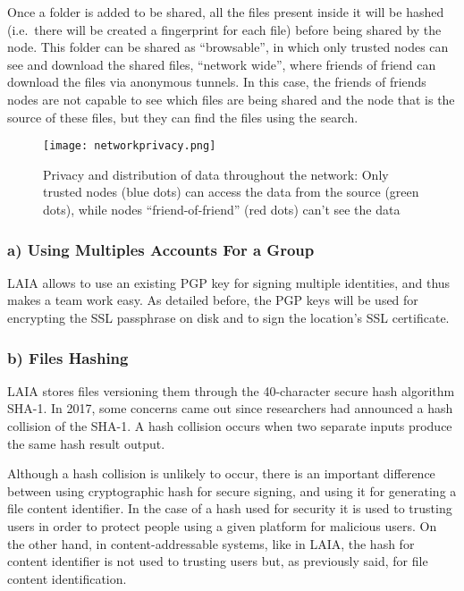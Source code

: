 \documentclass[conference,final,]{IEEEtran}
\makeatletter
\def\maxwidth{\ifdim\Gin@nat@width>\linewidth\linewidth
\else\Gin@nat@width\fi}
\let\Oldincludegraphics\includegraphics
\renewcommand{\includegraphics}[1]{\Oldincludegraphics[width=\maxwidth]{#1}}
\makeatother
\begin{document}
Once a folder is added to be shared, all the files present inside it
will be hashed (i.e.~there will be created a fingerprint for each file)
before being shared by the node. This folder can be shared as
``browsable'', in which only trusted nodes can see and download the
shared files, ``network wide'', where friends of friend can download the
files via anonymous tunnels. In this case, the friends of friends nodes
are not capable to see which files are being shared and the node that is
the source of these files, but they can find the files using the search.


\begin{figure}[htbp]
\centering
\texttt{[image: networkprivacy.png]}
\caption{Privacy and distribution of data throughout the network: Only
trusted nodes (blue dots) can access the data from the source (green
dots), while nodes ``friend-of-friend'' (red dots) can't see the data}
\end{figure}


\hypertarget{a-using-multiples-accounts-for-a-group}{%
\subsubsection{a) Using Multiples Accounts For a
Group}\label{a-using-multiples-accounts-for-a-group}}

LAIA allows to use an existing PGP key for signing multiple identities,
and thus makes a team work easy. As detailed before, the PGP keys will be
used for encrypting the SSL passphrase on disk and to sign the
location's SSL certificate.

\hypertarget{b-files-hashing}{%
\subsubsection{b) Files Hashing}\label{b-files-hashing}}

LAIA stores files versioning them through the 40-character
secure hash algorithm SHA-1. In 2017, some concerns came out since
researchers had announced a hash collision of the SHA-1. A hash
collision occurs when two separate inputs produce the same hash result
output.

Although a hash collision is unlikely to occur, there is an important
difference between using cryptographic hash for secure signing, and
using it for generating a file content identifier. In the case of a hash
used for security it is used to trusting users in order to protect people
using a given platform for malicious users. On the other hand, in
content-addressable systems, like in LAIA, the hash for content
identifier is not used to trusting users but, as previously said, for file
content identification.
\end{document}
